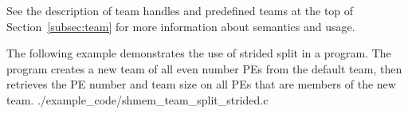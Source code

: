 \begin{apidefinition}
{  See the description of team handles and predefined teams at the top of
  Section~\ref{subsec:team} for more information about semantics and usage.
}

\begin{apiexamples}

    \apicexample
    {The following example demonstrates the use of strided split in a
    \Cstd[11] program. The program creates a new team of all even number
    \acp{PE} from the default team, then retrieves the \ac{PE} number and
    team size on all \acp{PE} that are members of the new team.}
    {./example_code/shmem_team_split_strided.c}
    {}

\end{apiexamples}

\end{apidefinition}

